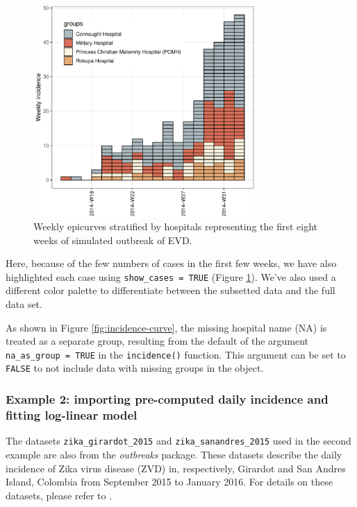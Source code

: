 \documentclass[9pt,a4paper]{extarticle}
\begin{document}
\begin{figure}[h!]
\centering
	\includegraphics[width=0.75\textwidth]{figures/incidence-early-curve-1.pdf}
	\caption{\label{fig:incidence-early-curve}Weekly epicurves stratified by hospitals representing the first eight weeks of
simulated outbreak of EVD.}
\end{figure}

Here, because of the few numbers of cases in the first few weeks, we have also highlighted each case using \texttt{show\_cases = TRUE} (Figure \ref{fig:incidence-early-curve}). We've also used a different color palette to differentiate between the subsetted data and the full data set.

As shown in Figure \ref{fig:incidence-curve}, the missing hospital name (NA) is treated as a separate group, resulting from the default of the argument \texttt{na\_as\_group = TRUE} in the \texttt{incidence()} function. This argument can be set to \texttt{FALSE} to not include data with missing groups in the object.

\subsubsection*{Example 2: importing pre-computed daily incidence and fitting log-linear model}

The datasets \texttt{zika\_girardot\_2015} and \texttt{zika\_sanandres\_2015} used in the second example are also from the \emph{outbreaks} package.
These datasets describe the daily incidence of Zika virus disease (ZVD) in, respectively, Girardot and San Andres Island, Colombia from September 2015 to January 2016.
For details on these datasets, please refer to \citet{Rojas2016-en}.
\end{document}
